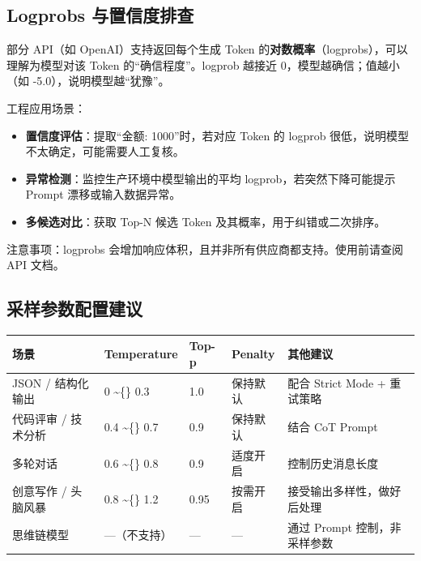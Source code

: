 \documentclass[9pt,a4paper,twocolumn]{ctexart}
\begin{document}
\subsection*{Logprobs 与置信度排查}


部分 API（如 OpenAI）支持返回每个生成 Token 的\textbf{对数概率}（logprobs），可以理解为模型对该 Token 的“确信程度”。logprob 越接近 0，模型越确信；值越小（如 -5.0），说明模型越“犹豫”。



工程应用场景：


\begin{itemize}[itemsep=1pt, topsep=2pt]
  \item \textbf{置信度评估}：提取“金额: 1000”时，若对应 Token 的 logprob 很低，说明模型不太确定，可能需要人工复核。
  \item \textbf{异常检测}：监控生产环境中模型输出的平均 logprob，若突然下降可能提示 Prompt 漂移或输入数据异常。
  \item \textbf{多候选对比}：获取 Top-N 候选 Token 及其概率，用于纠错或二次排序。
\end{itemize}


注意事项：logprobs 会增加响应体积，且并非所有供应商都支持。使用前请查阅 API 文档。



\subsection*{采样参数配置建议}

{\footnotesize
\begin{tabular}{|p{}|p{}|p{}|p{}|p{}|}
\hline
\textbf{场景} & \textbf{Temperature} & \textbf{Top-p} & \textbf{Penalty} & \textbf{其他建议} \\
\hline
JSON / 结构化输出 & 0 \textasciitilde\{\} 0.3 & 1.0 & 保持默认 & 配合 Strict Mode + 重试策略 \\
\hline
代码评审 / 技术分析 & 0.4 \textasciitilde\{\} 0.7 & 0.9 & 保持默认 & 结合 CoT Prompt \\
\hline
多轮对话 & 0.6 \textasciitilde\{\} 0.8 & 0.9 & 适度开启 & 控制历史消息长度 \\
\hline
创意写作 / 头脑风暴 & 0.8 \textasciitilde\{\} 1.2 & 0.95 & 按需开启 & 接受输出多样性，做好后处理 \\
\hline
思维链模型 & —（不支持） & — & — & 通过 Prompt 控制，非采样参数 \\
\hline
\end{tabular}
}
\end{document}
